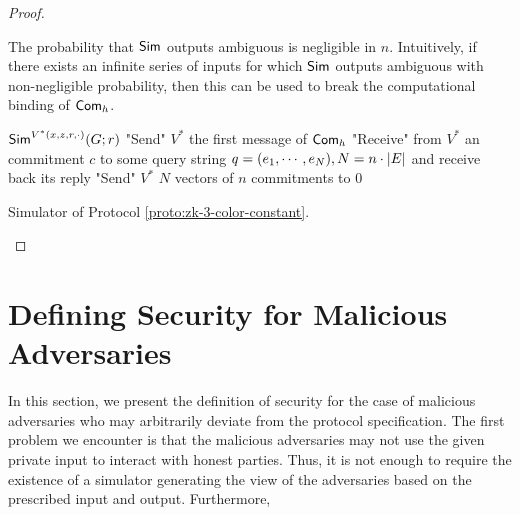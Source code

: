 \begin{proof}
\begin{claim} The probability that ${\sf Sim}$ outputs {\sf ambiguous} is negligible in $n$.
Intuitively, if there exists an infinite series of inputs for which ${\sf Sim}$ outputs {\sf ambiguous} with non-negligible probability, then this can be used to break the computational binding of ${\sf Com}_h$.
\end{claim}

\begin{algorithm}
${\sf Sim}^{V^*(x,z,r,\cdot)}(G;r)$\;
"Send" $V^*$ the first message of ${\sf Com}_h$\;
"Receive" from $V^*$ an commitment $c$ to some query string $q=(e_1,\cdots,e_N),N=n\cdot\left|E\right|$ and receive back its reply\;
"Send" $V^*$ $N$ vectors of $n$ commitments to $0$\;

\caption{Simulator of Protocol \ref{proto:zk-3-color-constant}.} \label{alg:zk-3-color-constant-sim}
\end{algorithm}

\end{proof}

\section{Defining Security for Malicious Adversaries}
In this section, we present the definition of security for the case of malicious adversaries who may arbitrarily deviate from the protocol specification. The first problem we encounter is that the malicious adversaries may not use the given private input to interact with honest parties. Thus, it is not enough to require the existence of a simulator generating the view of the adversaries based on the prescribed input and output. Furthermore,
